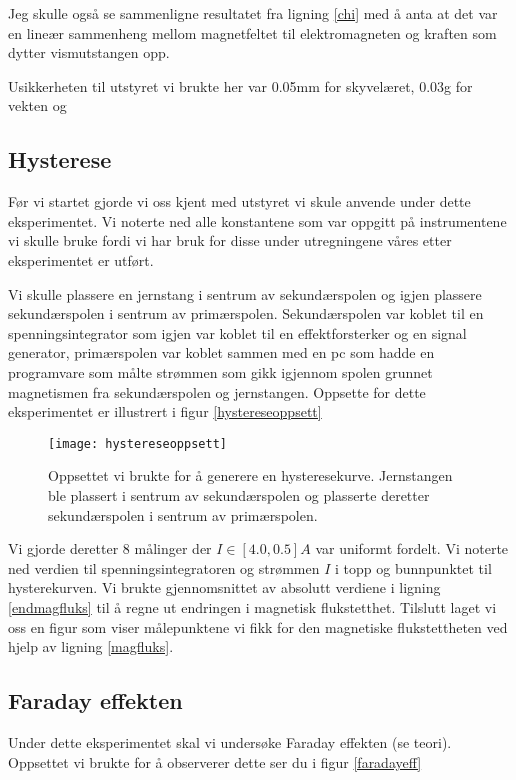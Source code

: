 \documentclass[norsk,a4paper,12pt]{article}
\begin{document}
Jeg skulle også se sammenligne resultatet fra ligning \ref{chi} med å anta at det var en lineær sammenheng mellom magnetfeltet til elektromagneten og kraften som dytter vismutstangen opp. 


Usikkerheten til utstyret vi brukte her var 0.05mm for skyvelæret, 0.03g for vekten og 
\subsection{Hysterese}
Før vi startet gjorde vi oss kjent med utstyret vi skule anvende under dette eksperimentet. Vi noterte ned alle konstantene som var oppgitt på instrumentene vi skulle bruke fordi vi har bruk for disse under utregningene våres etter eksperimentet er utført.

Vi skulle plassere en jernstang i sentrum av sekundærspolen og igjen plassere sekundærspolen i sentrum av primærspolen. Sekundærspolen var koblet til en spenningsintegrator som igjen var koblet til en effektforsterker og en signal generator, primærspolen var koblet sammen med en pc som hadde en programvare som målte strømmen som gikk igjennom spolen grunnet magnetismen fra sekundærspolen og jernstangen. Oppsette for dette eksperimentet er illustrert i figur \vref{hystereseoppsett}

 \begin{figure}[h!]
	\begin{center}
  	\texttt{[image: hystereseoppsett]}\\
	\caption[Oppsett til hysteresekurven]{Oppsettet vi brukte for å generere en hysteresekurve. Jernstangen ble plassert i sentrum av sekundærspolen og plasserte deretter sekundærspolen i sentrum av primærspolen.}
	\label{hystereseoppsett}
	\end{center}
\end{figure}

Vi gjorde deretter 8 målinger der $I \in [4.0,0.5]A$ var uniformt fordelt. Vi noterte ned verdien til spenningsintegratoren og strømmen $I$ i topp og bunnpunktet til hysterekurven. Vi brukte gjennomsnittet av absolutt verdiene i ligning \ref{endmagfluks} til å regne ut endringen i magnetisk flukstetthet. Tilslutt laget vi oss en figur som viser målepunktene vi fikk for den magnetiske flukstettheten ved hjelp av ligning \ref{magfluks}.

\subsection{Faraday effekten}
Under dette eksperimentet skal vi undersøke Faraday effekten (se teori). Oppsettet vi brukte for å observerer dette ser du i figur \vref{faradayeff}
\end{document}
